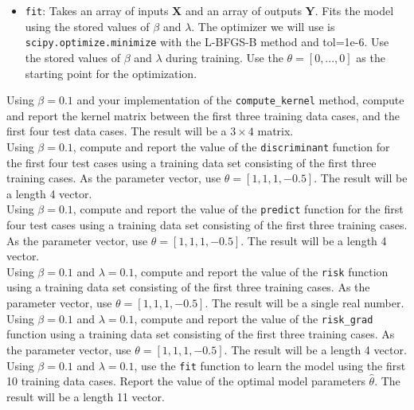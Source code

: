 \documentclass[11pt]{article}
\newcommand{\mbf}[1]{{\mathbf{#1}}}
\begin{document}
\begin{problem}{50}
\begin{itemize}
\item  \verb|fit|: Takes an array of inputs $\mbf{X}$ and an array of outputs $\mbf{Y}$. Fits the model using the stored values of $\beta$ and $\lambda$. The optimizer we will use is \verb|scipy.optimize.minimize| with the L-BFGS-B method and tol=1e-6. Use the stored values of $\beta$ and $\lambda$ during training. Use the $\theta=[0,...,0]$ as the starting point for the optimization.

\end{itemize}
 
 Using $\beta=0.1$ and your implementation of the  \verb|compute_kernel| method, compute and report the kernel matrix between the first three training data cases, and the first four test data cases. The result will be a $3\times 4$ matrix. \\

 Using $\beta=0.1$, compute and report the value of the  \verb|discriminant| function for the first four test cases using a training data set consisting of the first three training cases. As the parameter vector, use $\theta=[1,1,1,-0.5]$. The result will be a length 4 vector.\\

 Using $\beta=0.1$, compute and report the value of the  \verb|predict| function for the first four test cases using a training data set consisting of the first three training cases. As the parameter vector, use $\theta=[1,1,1,-0.5]$. The result will be a length 4 vector.\\

 Using $\beta=0.1$ and $\lambda=0.1$, compute and report the value of the  \verb|risk| function using a training data set consisting of the first three training cases. As the parameter vector, use $\theta=[1,1,1,-0.5]$. The result will be a single real number.\\

 Using $\beta=0.1$ and $\lambda=0.1$, compute and report the value of the  \verb|risk_grad| function using a training data set consisting of the first three training cases. As the parameter vector, use $\theta=[1,1,1,-0.5]$. The result will be a length 4 vector.\\

 Using $\beta=0.1$ and $\lambda=0.1$, use the \verb|fit| function to learn the model using the first 10 training data cases. Report the value of the optimal model parameters $\hat{\theta}$. The result will be a length 11 vector.\\


\end{problem}
\end{document}

